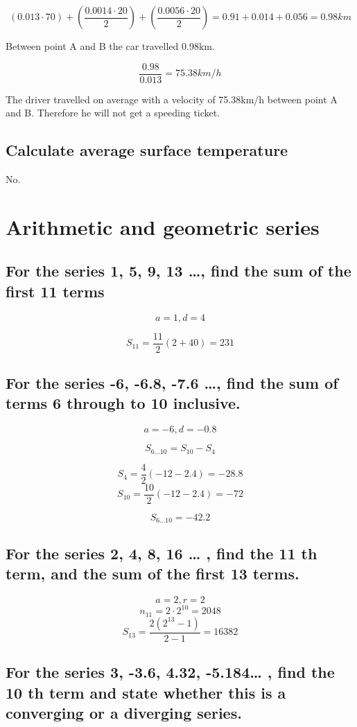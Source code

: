 \documentclass[12pt]{article}
\begin{document}
\[(0.013\cdot 70) + (\frac{0.0014 \cdot 20}{2}) + (\frac{0.0056 \cdot 20}{2}) = 0.91 + 0.014 + 0.056 = 0.98km\]

Between point A and B the car travelled 0.98km.

\[\frac{0.98}{0.013} = 75.38km/h\]

The driver travelled on average with a velocity of 75.38km/h between point A and B. Therefore he will not get a speeding ticket.

\subsection{Calculate average surface temperature}

No.

\section{Arithmetic and geometric series}

\subsection{For the series 1, 5, 9, 13 …, find the sum of the first 11 terms}

\[a=1, d=4\]

\[S_{11} = \frac{11}{2}(2+40)=231\]

\subsection{For the series -6, -6.8, -7.6 …, find the sum of terms 6 through to 10
inclusive.}

\[a=-6, d=-0.8\]

\[S_{6...10} = S_{10}-S_4\]

\[S_4=\frac{4}{2}(-12-2.4)=-28.8\]
\[S_{10}=\frac{10}{2}(-12-2.4)=-72\]

\[S_{6...10} = -42.2\]

\subsection{For the series 2, 4, 8, 16 … , find the 11
th term, and the sum of the first 13
terms.}

\[a=2, r=2\]
\[n_{11}=2\cdot2^{10}=2048\]
\[S_{13}=\frac{2(2^{13}-1)}{2-1}=16382\]

\subsection{For the series 3, -3.6, 4.32, -5.184… , find the 10
th term and state whether
this is a converging or a diverging series.}
\end{document}
